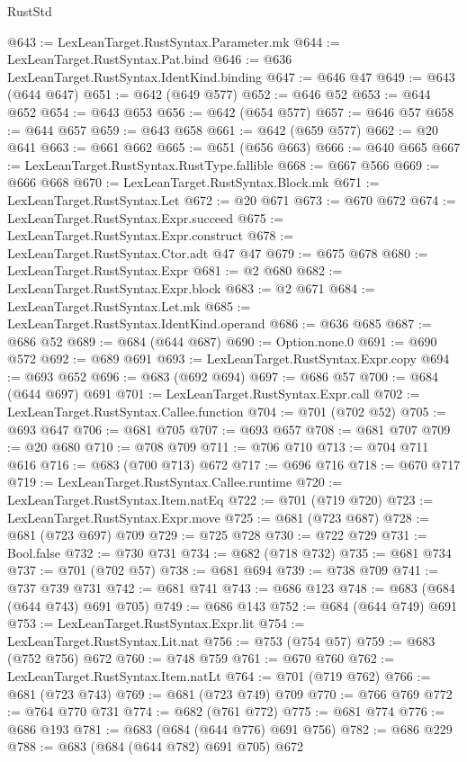 \begin{lexlean}{RustStd}
\begin{coremodule}
@643 := LexLeanTarget.RustSyntax.Parameter.mk
@644 := LexLeanTarget.RustSyntax.Pat.bind
@646 := @636 LexLeanTarget.RustSyntax.IdentKind.binding
@647 := @646 @47
@649 := @643 (@644 @647)
@651 := @642 (@649 @577)
@652 := @646 @52
@653 := @644 @652
@654 := @643 @653
@656 := @642 (@654 @577)
@657 := @646 @57
@658 := @644 @657
@659 := @643 @658
@661 := @642 (@659 @577)
@662 := @20 @641
@663 := @661 @662
@665 := @651 (@656 @663)
@666 := @640 @665
@667 := LexLeanTarget.RustSyntax.RustType.fallible
@668 := @667 @566
@669 := @666 @668
@670 := LexLeanTarget.RustSyntax.Block.mk
@671 := LexLeanTarget.RustSyntax.Let
@672 := @20 @671
@673 := @670 @672
@674 := LexLeanTarget.RustSyntax.Expr.succeed
@675 := LexLeanTarget.RustSyntax.Expr.construct
@678 := LexLeanTarget.RustSyntax.Ctor.adt @47 @47
@679 := @675 @678
@680 := LexLeanTarget.RustSyntax.Expr
@681 := @2 @680
@682 := LexLeanTarget.RustSyntax.Expr.block
@683 := @2 @671
@684 := LexLeanTarget.RustSyntax.Let.mk
@685 := LexLeanTarget.RustSyntax.IdentKind.operand
@686 := @636 @685
@687 := @686 @52
@689 := @684 (@644 @687)
@690 := Option.none.{0}
@691 := @690 @572
@692 := @689 @691
@693 := LexLeanTarget.RustSyntax.Expr.copy
@694 := @693 @652
@696 := @683 (@692 @694)
@697 := @686 @57
@700 := @684 (@644 @697) @691
@701 := LexLeanTarget.RustSyntax.Expr.call
@702 := LexLeanTarget.RustSyntax.Callee.function
@704 := @701 (@702 @52)
@705 := @693 @647
@706 := @681 @705
@707 := @693 @657
@708 := @681 @707
@709 := @20 @680
@710 := @708 @709
@711 := @706 @710
@713 := @704 @711 @616
@716 := @683 (@700 @713) @672
@717 := @696 @716
@718 := @670 @717
@719 := LexLeanTarget.RustSyntax.Callee.runtime
@720 := LexLeanTarget.RustSyntax.Item.natEq
@722 := @701 (@719 @720)
@723 := LexLeanTarget.RustSyntax.Expr.move
@725 := @681 (@723 @687)
@728 := @681 (@723 @697) @709
@729 := @725 @728
@730 := @722 @729
@731 := Bool.false
@732 := @730 @731
@734 := @682 (@718 @732)
@735 := @681 @734
@737 := @701 (@702 @57)
@738 := @681 @694
@739 := @738 @709
@741 := @737 @739 @731
@742 := @681 @741
@743 := @686 @123
@748 := @683 (@684 (@644 @743) @691 @705)
@749 := @686 @143
@752 := @684 (@644 @749) @691
@753 := LexLeanTarget.RustSyntax.Expr.lit
@754 := LexLeanTarget.RustSyntax.Lit.nat
@756 := @753 (@754 @57)
@759 := @683 (@752 @756) @672
@760 := @748 @759
@761 := @670 @760
@762 := LexLeanTarget.RustSyntax.Item.natLt
@764 := @701 (@719 @762)
@766 := @681 (@723 @743)
@769 := @681 (@723 @749) @709
@770 := @766 @769
@772 := @764 @770 @731
@774 := @682 (@761 @772)
@775 := @681 @774
@776 := @686 @193
@781 := @683 (@684 (@644 @776) @691 @756)
@782 := @686 @229
@788 := @683 (@684 (@644 @782) @691 @705) @672

\end{coremodule}
\end{lexlean}

